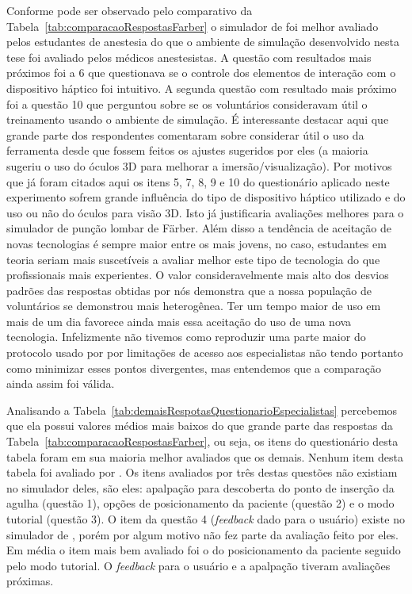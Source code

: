 Conforme pode ser observado pelo comparativo da Tabela~\ref{tab:comparacaoRespostasFarber} o simulador de \textcite{Farber2009} foi melhor avaliado pelos estudantes de anestesia do que o ambiente de simulação desenvolvido nesta tese foi avaliado pelos médicos anestesistas. A questão com resultados mais próximos foi a 6 que questionava se o controle dos elementos de interação com o dispositivo háptico foi intuitivo. A segunda questão com resultado mais próximo foi a questão 10 que perguntou sobre se os voluntários consideravam útil o treinamento usando o ambiente de simulação. É interessante destacar aqui que grande parte dos respondentes comentaram sobre considerar útil o uso da ferramenta desde que fossem feitos os ajustes sugeridos por eles (a maioria sugeriu o uso do óculos 3D para melhorar a imersão/visualização). Por motivos que já foram citados aqui os itens 5, 7, 8, 9 e 10 do questionário aplicado neste experimento sofrem grande influência do tipo de dispositivo háptico utilizado e do uso ou não do óculos para visão 3D. Isto já justificaria avaliações melhores para o simulador de punção lombar de Färber. Além disso a tendência de aceitação de novas tecnologias é sempre maior entre os mais jovens, no caso, estudantes em teoria seriam mais suscetíveis a avaliar melhor este tipo de tecnologia do que profissionais mais experientes. O valor consideravelmente mais alto dos desvios padrões das respostas obtidas por nós demonstra que a nossa população de voluntários se demonstrou mais heterogênea. Ter um tempo maior de uso em mais de um dia favorece ainda mais essa aceitação do uso de uma nova tecnologia. Infelizmente não tivemos como reproduzir uma parte maior do protocolo usado por \textcite{Farber2009} por limitações de acesso aos especialistas não tendo portanto como minimizar esses pontos divergentes, mas entendemos que a comparação ainda assim foi válida.

Analisando a Tabela~\ref{tab:demaisRespotasQuestionarioEspecialistas} percebemos que ela possui valores médios mais baixos do que grande parte das respostas da Tabela~\ref{tab:comparacaoRespostasFarber}, ou seja, os itens do questionário desta tabela foram em sua maioria melhor avaliados que os demais. Nenhum item desta tabela foi avaliado por \textcite{Farber2009}. Os itens avaliados por três destas questões não existiam no simulador deles, são eles: apalpação para descoberta do ponto de inserção da agulha (questão 1), opções de posicionamento da paciente (questão 2) e o modo tutorial (questão 3). O item da questão 4 (\textit{feedback} dado para o usuário) existe no simulador de \textcite{Farber2009}, porém por algum motivo não fez parte da avaliação feito por eles. Em média o item mais bem avaliado foi o do posicionamento da paciente seguido pelo modo tutorial. O \textit{feedback} para o usuário e a apalpação tiveram avaliações próximas.
